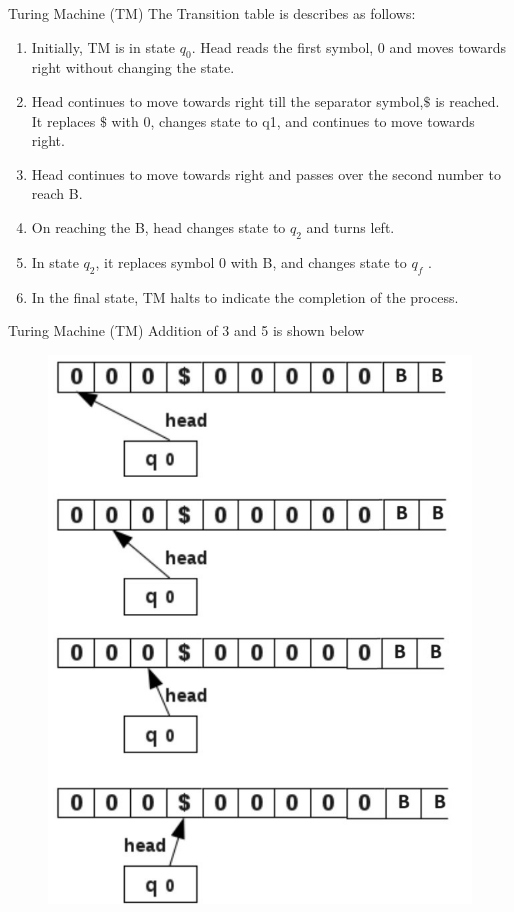 \documentclass{beamer}
\begin{document}
\begin{frame}{Turing Machine (TM)} 
The Transition table  is describes as follows:
\begin{enumerate}
	\item  Initially, TM is in state $q_0$. Head reads the first symbol, 0 and moves towards right without changing the state.
	\item Head continues to move towards right till the separator symbol,$\$ $ is reached. It replaces $ \$ $ with 0, changes state to
	q1, and continues to move towards right.
	\item Head continues to move towards right and passes over the second number to reach B.
	\item On reaching the B, head changes state to $q_2$ and turns left.
	\item In state $q_2$, it replaces symbol 0 with B, and changes state to $q_f$ .
	\item In the final state, TM halts to indicate the completion of the process.

\end{enumerate}
\end{frame}	
\begin{frame}{Turing Machine (TM)} 
	Addition of 3 and 5 is shown below
\begin{figure}
	\includegraphics[scale=.4]{img5/m10}
\end{figure}
\end{frame}	
\end{document}
